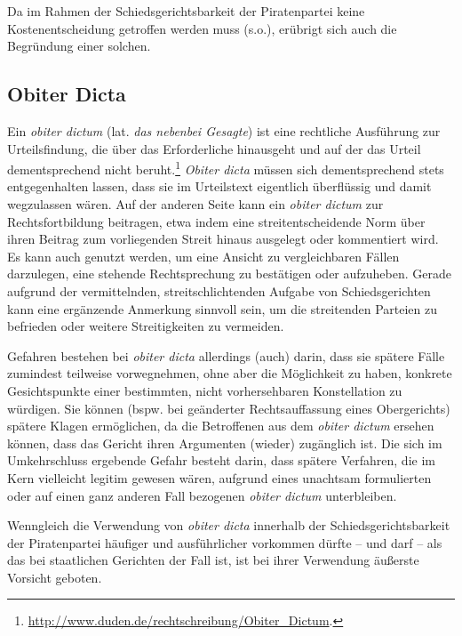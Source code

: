 Da im Rahmen der Schiedsgerichtsbarkeit der Piratenpartei keine Kostenentscheidung getroffen werden muss (s.o.), erübrigt sich auch die Begründung einer solchen.

\subsection{Obiter Dicta}
Ein \emph{obiter dictum} (lat. \emph{das nebenbei Gesagte}) ist eine rechtliche Ausführung zur Urteilsfindung, die über das Erforderliche hinausgeht und auf der das Urteil dementsprechend nicht beruht.\footnote{\url{http://www.duden.de/rechtschreibung/Obiter_Dictum}.}
\emph{Obiter dicta} müssen sich dementsprechend stets entgegenhalten lassen, dass sie im Urteilstext eigentlich überflüssig und damit wegzulassen wären.
Auf der anderen Seite kann ein \emph{obiter dictum} zur Rechtsfortbildung beitragen, etwa indem eine streitentscheidende Norm über ihren Beitrag zum vorliegenden Streit hinaus ausgelegt oder kommentiert wird.
Es kann auch genutzt werden, um eine Ansicht zu vergleichbaren Fällen darzulegen, eine stehende Rechtsprechung zu bestätigen oder aufzuheben.
Gerade aufgrund der vermittelnden, streitschlichtenden Aufgabe von Schiedsgerichten kann eine ergänzende Anmerkung sinnvoll sein, um die streitenden Parteien zu befrieden oder weitere Streitigkeiten  zu vermeiden.

Gefahren bestehen bei \emph{obiter dicta} allerdings (auch) darin, dass sie spätere Fälle zumindest teilweise vorwegnehmen, ohne aber die Möglichkeit zu haben, konkrete Gesichtspunkte einer bestimmten, nicht vorhersehbaren Konstellation zu würdigen.
Sie können (bspw. bei geänderter Rechtsauffassung eines Obergerichts) spätere Klagen ermöglichen, da die Betroffenen aus dem \emph{obiter dictum} ersehen können, dass das Gericht ihren Argumenten (wieder) zugänglich ist.
Die sich im Umkehrschluss ergebende Gefahr besteht darin, dass spätere Verfahren, die im Kern vielleicht legitim gewesen wären, aufgrund eines unachtsam formulierten oder auf einen ganz anderen Fall bezogenen \emph{obiter dictum} unterbleiben.

Wenngleich die Verwendung von \emph{obiter dicta} innerhalb der Schiedsgerichtsbarkeit der Piratenpartei häufiger und ausführlicher vorkommen dürfte – und darf – als das bei staatlichen Gerichten der Fall ist, ist bei ihrer Verwendung äußerste Vorsicht geboten.

